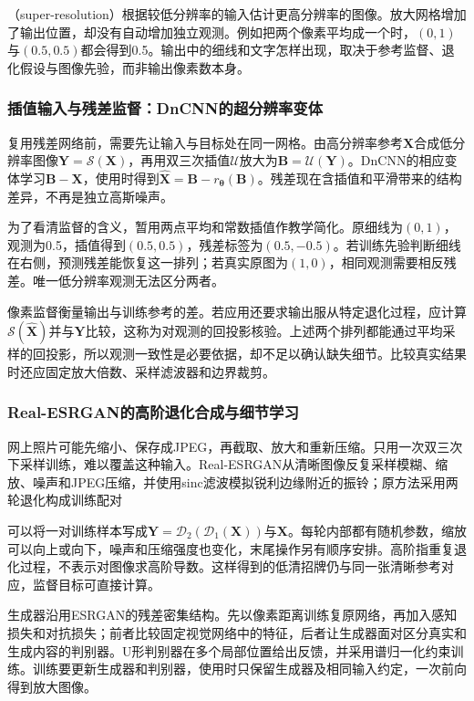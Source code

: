 （super-resolution）根据较低分辨率的输入估计更高分辨率的图像。放大网格增加了输出位置，却没有自动增加独立观测。例如把两个像素平均成一个时，$(0,1)$与$(0.5,0.5)$都会得到0.5。输出中的细线和文字怎样出现，取决于参考监督、退化假设与图像先验，而非输出像素数本身。

\subsubsection{插值输入与残差监督：DnCNN的超分辨率变体}
\label{sec:vision-restoration-dncnn-sr}

复用残差网络前，需要先让输入与目标处在同一网格。由高分辨率参考$\bm{X}$合成低分辨率图像$\bm{Y}=\mathcal{S}(\bm{X})$，再用双三次插值$\mathcal{U}$放大为$\bm{B}=\mathcal{U}(\bm{Y})$。DnCNN的相应变体学习$\bm{B}-\bm{X}$，使用时得到$\widehat{\bm{X}}=\bm{B}-r_{\bm{\theta}}(\bm{B})$。残差现在含插值和平滑带来的结构差异，不再是独立高斯噪声。

为了看清监督的含义，暂用两点平均和常数插值作教学简化。原细线为$(0,1)$，观测为0.5，插值得到$(0.5,0.5)$，残差标签为$(0.5,-0.5)$。若训练先验判断细线在右侧，预测残差能恢复这一排列；若真实原图为$(1,0)$，相同观测需要相反残差。唯一低分辨率观测无法区分两者。

像素监督衡量输出与训练参考的差。若应用还要求输出服从特定退化过程，应计算$\mathcal{S}(\widehat{\bm{X}})$并与$\bm{Y}$比较，这称为对观测的回投影核验。上述两个排列都能通过平均采样的回投影，所以观测一致性是必要依据，却不足以确认缺失细节。比较真实结果时还应固定放大倍数、采样滤波器和边界裁剪。

\Needspace{60mm}
\subsubsection{Real-ESRGAN的高阶退化合成与细节学习}
\label{sec:vision-restoration-real-esrgan}

网上照片可能先缩小、保存成JPEG，再截取、放大和重新压缩。只用一次双三次下采样训练，难以覆盖这种输入。Real-ESRGAN从清晰图像反复采样模糊、缩放、噪声和JPEG压缩，并使用sinc滤波模拟锐利边缘附近的振铃；原方法采用两轮退化构成训练配对

可以将一对训练样本写成$\bm{Y}=\mathcal{D}_2(\mathcal{D}_1(\bm{X}))$与$\bm{X}$。每轮内部都有随机参数，缩放可以向上或向下，噪声和压缩强度也变化，末尾操作另有顺序安排。高阶指重复退化过程，不表示对图像求高阶导数。这样得到的低清招牌仍与同一张清晰参考对应，监督目标可直接计算。

生成器沿用ESRGAN的残差密集结构。先以像素距离训练复原网络，再加入感知损失和对抗损失；前者比较固定视觉网络中的特征，后者让生成器面对区分真实和生成内容的判别器。U形判别器在多个局部位置给出反馈，并采用谱归一化约束训练。训练要更新生成器和判别器，使用时只保留生成器及相同输入约定，一次前向得到放大图像。

